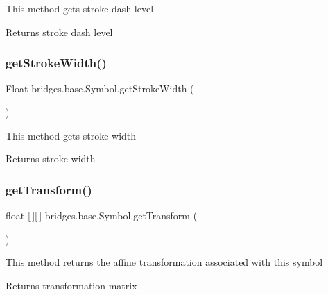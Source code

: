 This method gets stroke dash level

\begin{DoxyReturn}{Returns}
stroke dash level 
\end{DoxyReturn}
\mbox{\label{classbridges_1_1base_1_1_symbol_aa9f4b8ed61cfd3a30dc979d53526ab4e}} 
\subsubsection{\texorpdfstring{get\+Stroke\+Width()}{getStrokeWidth()}}
{\footnotesize\ttfamily Float bridges.\+base.\+Symbol.\+get\+Stroke\+Width (\begin{DoxyParamCaption}{ }\end{DoxyParamCaption})}

This method gets stroke width

\begin{DoxyReturn}{Returns}
stroke width 
\end{DoxyReturn}
\mbox{\label{classbridges_1_1base_1_1_symbol_a1660fd3420a9d16a0248bc56a459782e}} 
\subsubsection{\texorpdfstring{get\+Transform()}{getTransform()}}
{\footnotesize\ttfamily float \mbox{[}$\,$\mbox{]}\mbox{[}$\,$\mbox{]} bridges.\+base.\+Symbol.\+get\+Transform (\begin{DoxyParamCaption}{ }\end{DoxyParamCaption})}

This method returns the affine transformation associated with this symbol

\begin{DoxyReturn}{Returns}
transformation matrix 
\end{DoxyReturn}
\mbox{\label{classbridges_1_1base_1_1_symbol_a26e22be6446757ba7e05f0519ad0167c}} 
